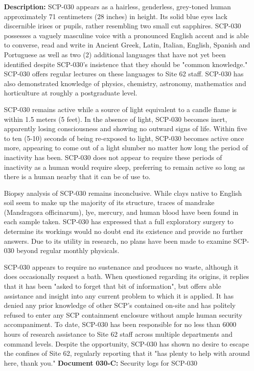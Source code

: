 \textbf{Description:} SCP-030 appears as a hairless, genderless, grey-toned human approximately 71 centimeters (28 inches) in height. Its solid blue eyes lack discernible irises or pupils, rather resembling two small cut sapphires. SCP-030 possesses a vaguely masculine voice with a pronounced English accent and is able to converse, read and write in Ancient Greek, Latin, Italian, English, Spanish and Portuguese as well as two (2) additional languages that have not yet been identified despite SCP-030's insistence that they should be "common knowledge." SCP-030 offers regular lectures on these languages to Site 62 staff. SCP-030 has also demonstrated knowledge of physics, chemistry, astronomy, mathematics and horticulture at roughly a postgraduate level.

SCP-030 remains active while a source of light equivalent to a candle flame is within 1.5 meters (5 feet). In the absence of light, SCP-030 becomes inert, apparently losing consciousness and showing no outward signs of life. Within five to ten (5-10) seconds of being re-exposed to light, SCP-030 becomes active once more, appearing to come out of a light slumber no matter how long the period of inactivity has been. SCP-030 does not appear to require these periods of inactivity as a human would require sleep, preferring to remain active so long as there is a human nearby that it can be of use to.

Biopsy analysis of SCP-030 remains inconclusive. While clays native to English soil seem to make up the majority of its structure, traces of mandrake (Mandragora officinarum), lye, mercury, and human blood have been found in each sample taken. SCP-030 has expressed that a full exploratory surgery to determine its workings would no doubt end its existence and provide no further answers. Due to its utility in research, no plans have been made to examine SCP-030 beyond regular monthly physicals.

SCP-030 appears to require no sustenance and produces no waste, although it does occasionally request a bath. When questioned regarding its origins, it replies that it has been "asked to forget that bit of information", but offers able assistance and insight into any current problem to which it is applied. It has denied any prior knowledge of other SCP's contained on-site and has politely refused to enter any SCP containment enclosure without ample human security accompaniment. To date, SCP-030 has been responsible for no less than 6000 hours of research assistance to Site 62 staff across multiple departments and command levels. Despite the opportunity, SCP-030 has shown no desire to escape the confines of Site 62, regularly reporting that it "has plenty to help with around here, thank you."
\newpage
\textbf{Document 030-C:} Security logs for SCP-030

